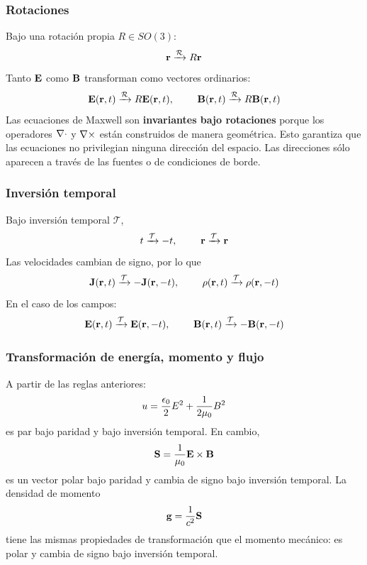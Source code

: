 \documentclass[]{article}
\numberwithin{equation}{section}
\begin{document}
\subsubsection{Rotaciones}
Bajo una rotación propia \(R \in SO(3)\):
\begin{equation*}
	\mathbf{r} \xrightarrow{\mathcal{R}} R\mathbf{r}
\end{equation*}
Tanto \(\mathbf{E}\) como \(\mathbf{B}\) transforman como vectores ordinarios:
\begin{equation}
	\mathbf{E}(\mathbf{r},t) \xrightarrow{\mathcal{R}} R\mathbf{E}(\mathbf{r},t), ~~~~~~~ \mathbf{B}(\mathbf{r},t) \xrightarrow{\mathcal{R}} R\mathbf{B}(\mathbf{r},t)
\end{equation}
Las ecuaciones de Maxwell son \textbf{invariantes bajo rotaciones} porque los operadores \(\nabla\cdot\) y \(\nabla\times\) están construidos de manera geométrica. Esto garantiza que las ecuaciones no privilegian ninguna dirección del espacio. Las direcciones sólo aparecen a través de las fuentes o de condiciones de borde.

\subsubsection{Inversión temporal}
Bajo inversión temporal \(\mathcal{T}\),
\begin{equation*}
	t \xrightarrow{\mathcal{T}} -t, ~~~~~~~ \mathbf{r} \xrightarrow{\mathcal{T}} \mathbf{r}
\end{equation*}
Las velocidades cambian de signo, por lo que
\begin{equation}
	\mathbf{J}(\mathbf{r},t) \xrightarrow{\mathcal{T}} -\mathbf{J}(\mathbf{r},-t), ~~~~~~~ \rho(\mathbf{r},t) \xrightarrow{\mathcal{T}} \rho(\mathbf{r},-t)
\end{equation}
En el caso de los campos:
\begin{equation}
	\mathbf{E}(\mathbf{r},t) \xrightarrow{\mathcal{T}} \mathbf{E}(\mathbf{r},-t), ~~~~~~~ \mathbf{B}(\mathbf{r},t) \xrightarrow{\mathcal{T}} -\mathbf{B}(\mathbf{r},-t)
\end{equation}

\subsubsection{Transformación de energía, momento y flujo}
A partir de las reglas anteriores:
\begin{equation*}
	u = \frac{\epsilon_{0}}{2} E^2 + \frac{1}{2\mu_{0}}B^2
\end{equation*}
es par bajo paridad y bajo inversión temporal. En cambio,
\begin{equation*}
	\mathbf{S} = \frac{1}{\mu_{0}} \mathbf{E}\times\mathbf{B}
\end{equation*}
es un vector polar bajo paridad y cambia de signo bajo inversión temporal. La densidad de momento
\begin{equation*}
	\mathbf{g} = \frac{1}{c^2} \mathbf{S}
\end{equation*}
tiene las mismas propiedades de transformación que el momento mecánico: es polar y cambia de signo bajo inversión temporal.
\end{document}
